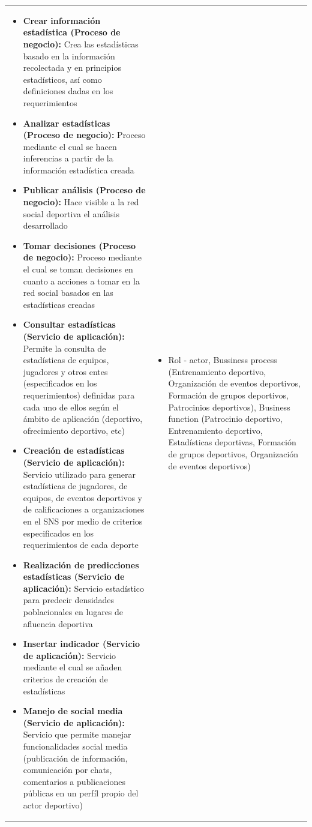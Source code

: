 \begin{table}[!htb]
\begin{center}
{\begin{tabular}{|p{7cm}|p{4cm}|}
\begin{itemize}
				\item \textbf{Crear información estadística (Proceso de negocio):} Crea las estadísticas basado en la información recolectada y en principios estadísticos, así como definiciones dadas en los requerimientos
				\item \textbf{Analizar estadísticas (Proceso de negocio):} Proceso mediante el cual se hacen inferencias a partir de la información estadística creada
				\item \textbf{Publicar análisis (Proceso de negocio):} Hace visible a la red social deportiva el análisis desarrollado
				\item \textbf{Tomar decisiones (Proceso de negocio):} Proceso mediante el cual se toman decisiones en cuanto a acciones a tomar en la red social basados en las estadísticas creadas
				\item \textbf{Consultar estadísticas (Servicio de aplicación):} Permite la consulta de estadísticas de equipos, jugadores y otros entes (especificados en los requerimientos) definidas para cada uno de ellos según el ámbito de aplicación (deportivo, ofrecimiento deportivo, etc)
				\item \textbf{Creación de estadísticas (Servicio de aplicación):} Servicio utilizado para generar estadísticas de jugadores, de equipos, de eventos deportivos y de calificaciones a organizaciones en el SNS por medio de criterios especificados en los requerimientos de cada deporte
				\item \textbf{Realización de predicciones estadísticas (Servicio de aplicación):} Servicio estadístico para predecir densidades poblacionales en lugares de afluencia deportiva
				\item \textbf{Insertar indicador (Servicio de aplicación):} Servicio mediante el cual se añaden criterios de creación de estadísticas
				\item \textbf{Manejo de social media (Servicio de aplicación):} Servicio que permite manejar funcionalidades social media (publicación de información, comunicación por chats, comentarios a publicaciones públicas en un perfíl propio del actor deportivo)
			\end{itemize} 
			&
			\begin{itemize}
				\item Rol - actor, Bussiness process (Entrenamiento deportivo, Organización de eventos deportivos, Formación de grupos deportivos, Patrocinios deportivos), Business function (Patrocinio deportivo, Entrenamiento deportivo, Estadísticas deportivas, Formación de grupos deportivos, Organización de eventos deportivos)

\end{itemize}
\end{tabular}}
\end{center}
\end{table}
